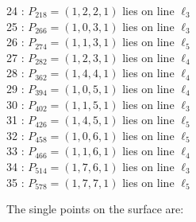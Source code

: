 \documentclass{article}
\begin{document}
{\begin{multicols}{2}
24 : $P_{218}=( 1, 2, 2, 1 )$ lies on line $\ell_{3}$\\
25 : $P_{266}=( 1, 0, 3, 1 )$ lies on line $\ell_{3}$\\
26 : $P_{274}=( 1, 1, 3, 1 )$ lies on line $\ell_{5}$\\
27 : $P_{282}=( 1, 2, 3, 1 )$ lies on line $\ell_{4}$\\
28 : $P_{362}=( 1, 4, 4, 1 )$ lies on line $\ell_{4}$\\
29 : $P_{394}=( 1, 0, 5, 1 )$ lies on line $\ell_{4}$\\
30 : $P_{402}=( 1, 1, 5, 1 )$ lies on line $\ell_{3}$\\
31 : $P_{426}=( 1, 4, 5, 1 )$ lies on line $\ell_{5}$\\
32 : $P_{458}=( 1, 0, 6, 1 )$ lies on line $\ell_{5}$\\
33 : $P_{466}=( 1, 1, 6, 1 )$ lies on line $\ell_{4}$\\
34 : $P_{514}=( 1, 7, 6, 1 )$ lies on line $\ell_{3}$\\
35 : $P_{578}=( 1, 7, 7, 1 )$ lies on line $\ell_{5}$\\
\end{multicols}
The single points on the surface are:\\
}
\end{document}
